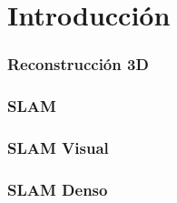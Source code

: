 \section{Introducción}

\begin{frame}
\frametitle{Reconstrucción 3D}
\end{frame}

\begin{frame}
\frametitle{SLAM}
\end{frame}

\begin{frame}
\frametitle{SLAM Visual}
\end{frame}

\begin{frame}
\frametitle{SLAM Denso}
\end{frame}